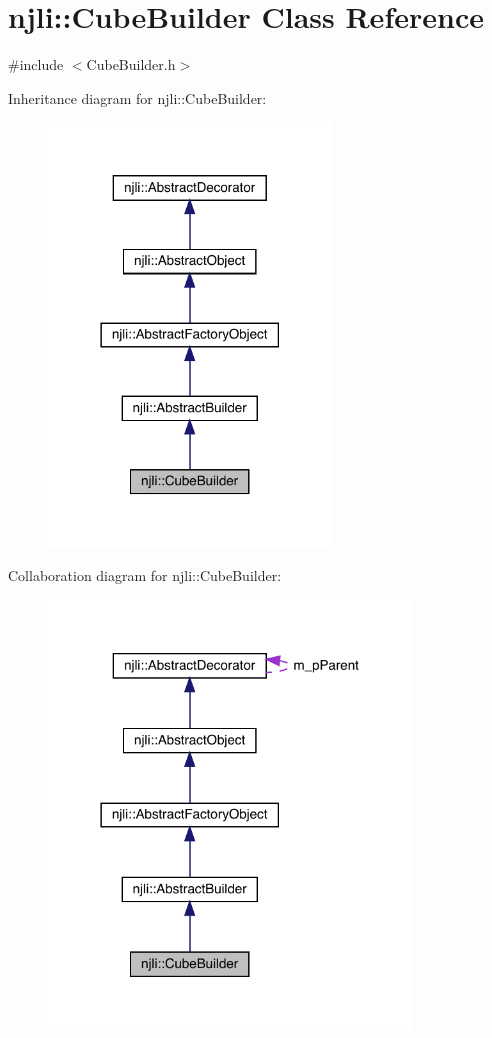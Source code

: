 \hypertarget{classnjli_1_1_cube_builder}{}\section{njli\+:\+:Cube\+Builder Class Reference}
\label{classnjli_1_1_cube_builder}


{\ttfamily \#include $<$Cube\+Builder.\+h$>$}



Inheritance diagram for njli\+:\+:Cube\+Builder\+:\nopagebreak
\begin{figure}[H]
\begin{center}
\leavevmode
\includegraphics[width=213pt]{classnjli_1_1_cube_builder__inherit__graph}
\end{center}
\end{figure}


Collaboration diagram for njli\+:\+:Cube\+Builder\+:\nopagebreak
\begin{figure}[H]
\begin{center}
\leavevmode
\includegraphics[width=273pt]{classnjli_1_1_cube_builder__coll__graph}
\end{center}
\end{figure}
